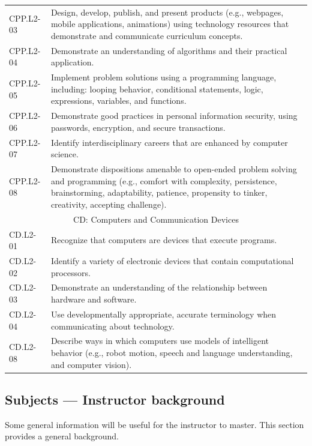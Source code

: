 \documentclass[11pt]{article}
\begin{document}
\begin{longtable}{lp{}}
CPP.L2-03 & Design, develop, publish, and present products (e.g., webpages, mobile applications, animations) using technology resources that demonstrate and communicate curriculum concepts. \\
CPP.L2-04 & Demonstrate an understanding of algorithms and their practical application. \\
CPP.L2-05 & Implement problem solutions using a programming language, including: looping behavior, conditional statements, logic, expressions, variables, and functions. \\
CPP.L2-06 & Demonstrate good practices in personal information security, using passwords, encryption, and secure transactions. \\
CPP.L2-07 & Identify interdisciplinary careers that are enhanced by computer science. \\
CPP.L2-08 & Demonstrate dispositions amenable to open-ended problem solving and programming (e.g., comfort with complexity, persistence, brainstorming, adaptability, patience, propensity to tinker, creativity, accepting challenge). \\\hline

\multicolumn{2}{c}{\rule{0pt}{15pt}CD: Computers and Communication Devices} \\ \hline


CD.L2-01 & Recognize that computers are devices that execute programs. \\
CD.L2-02 & Identify a variety of electronic devices that contain computational processors. \\
CD.L2-03 & Demonstrate an understanding of the relationship between hardware and software. \\
CD.L2-04 & Use developmentally appropriate, accurate terminology when communicating about technology. \\
CD.L2-08 & Describe ways in which computers use models of intelligent behavior (e.g., robot motion, speech and language understanding, and computer vision). \\ \hline

\end{longtable}


\subsection{Subjects --- Instructor background}

Some general information will be useful for the instructor to master.
This section provides a general background.
\end{document}
